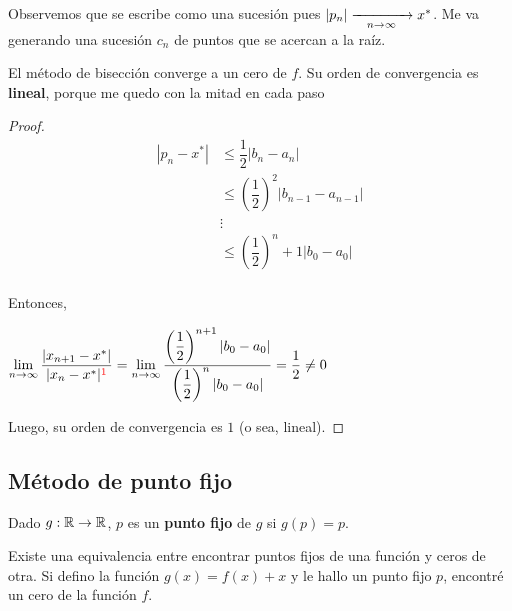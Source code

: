 \documentclass[]{article}
\begin{document}
Observemos que se escribe como una sucesión pues $|p_n|\xrightarrow[\hspace*{0.3cm} n\to\infty \hspace*{0.3cm}]{}x^*$. Me va generando una sucesión $c_n$ de puntos que se acercan a la raíz.

\begin{prop}
	El método de bisección converge a un cero de $f$. Su orden de convergencia es \textbf{lineal}, porque me quedo con la mitad en cada paso
	\begin{proof}


		\begin{align*}
			|p_n - x^*| &\leq \dfrac{1}{2}|b_n-a_n|\\
			&\leq \left(\dfrac{1}{2}\right)^2 |b_{n-1}-a_{n-1}| \\
			& \vdots \\
			& \leq\left(\dfrac{1}{2}\right)^n+1 |b_{0}-a_{0}| \\
		\end{align*}

		Entonces,
		\begin{center}
			$\displaystyle  \lim_{n\to\infty} \displaystyle \frac{|x_{n+1}-x^*|}{|x_n - x^*|^{\mathbin{\color{red}{1}}}} = \lim_{n\to\infty} \displaystyle \frac{\left(\displaystyle \frac{1}{2}\right)^{n+1} |b_{0}-a_{0}|}{\left(\displaystyle \frac{1}{2}\right)^n |b_{0}-a_{0}|} = \displaystyle \frac{1}{2} \neq 0$
		\end{center}

		Luego, su orden de convergencia es $1$ (o sea, lineal).
	\end{proof}
\end{prop}

\subsection{Método de punto fijo}
\begin{defi}
	Dado $g:\mathbb{R}\to\mathbb{R}$, $p$ es un \textbf{punto fijo} de $g$ si $g(p)=p$.
\end{defi}

Existe una equivalencia entre encontrar puntos fijos de una función y ceros de otra. Si defino la función $g(x)=f(x)+x$ y le hallo un punto fijo $p$, encontré un cero de la función $f$.
\end{document}
